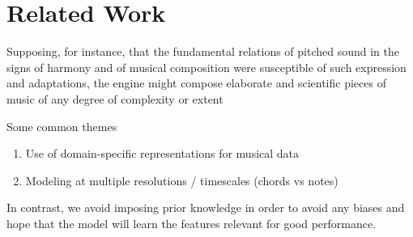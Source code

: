 \chapter{Related Work}
\begin{savequote}[75mm]
  Supposing, for instance, that the fundamental relations of pitched sound in the
  signs of harmony and of musical composition were susceptible of such expression and
  adaptations, the engine might compose elaborate and scientific pieces of music
  of any degree of complexity or extent
\end{savequote}




\ifpdf
    \graphicspath{{Chapter3/Figs/Raster/}{Chapter3/Figs/PDF/}{Chapter3/Figs/}}
\else
    \graphicspath{{Chapter3/Figs/Vector/}{Chapter3/Figs/}}
\fi

Some common themes
\begin{enumerate}
  \item Use of domain-specific representations for musical data
  \item Modeling at multiple resolutions / timescales (\ie chords vs notes)
\end{enumerate}
In contrast, we avoid imposing prior knowledge in order to avoid any biases
and hope that the model will learn the features relevant for good performance.

